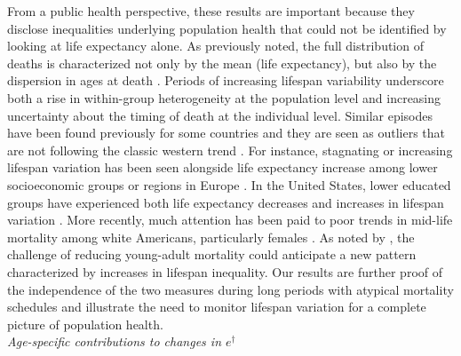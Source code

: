 \documentclass{article}
\begin{document}
\begin{spacing}{1.5}
From a public health perspective, these results are important because they disclose inequalities underlying population health that could not be identified by looking at life expectancy alone. As previously noted, the full distribution of deaths is characterized not only by the mean (life expectancy), but also by \textcolor[rgb]{1,0,0}{the dispersion in} ages at death \citep{edwards2005}. \textcolor[rgb]{1,0,0}{Periods of} increasing lifespan variability underscore \textcolor[rgb]{1,0,0}{both a} rise in within-group heterogeneity \textcolor[rgb]{1,0,0}{at the population level and increasing uncertainty about the timing of death at the individual level}. Similar \textcolor[rgb]{1,0,0}{episodes} have been found previously for some countries and they are seen as outliers that are not following the classic western trend \citep{wilmoth1999,zhang2009}. For instance, stagnating or increasing lifespan variation has been seen alongside life expectancy increase among lower socioeconomic groups or regions in Europe \citep{vanraalte2014,bronnum-hansen2017,seaman2016increasing}. \textcolor[rgb]{1,0,0}{In the United States, lower educated groups have experienced both life expectancy decreases and increases in lifespan variation }\citep{sasson2016trends}. More recently, much attention has been paid to poor trends in mid-life mortality among white Americans, particularly females \citep{case2015rising,montez2013trends}. As noted by \citet{gillespie2014divergence}, the challenge of reducing young-adult mortality could anticipate a new pattern characterized by increases in lifespan inequality. Our results are further proof of the independence of the two measures during long periods with atypical mortality schedules and illustrate the need to monitor lifespan variation for a complete picture of population health.\\

\emph{Age-specific contributions to changes in $e^\dagger$}\\


\end{spacing}
\end{document}
